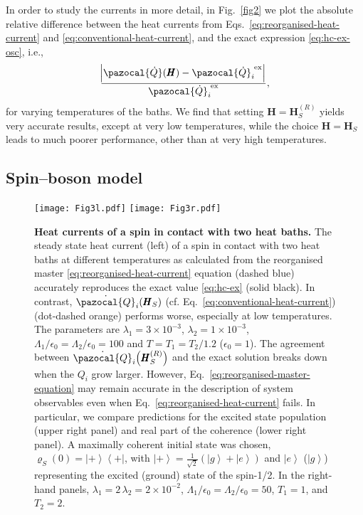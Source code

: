 \documentclass[aps,pra,superscriptaddress,twocolumn,nofootinbib]{revtex4-2}
\newcommand{\ket}[1]{\left\vert#1\right\rangle}
\newcommand{\bra}[1]{\left\langle#1\right\vert}
\begin{document}
In order to study the currents in more detail, in Fig.~\ref{fig2} we plot the absolute relative difference between the heat currents from Eqs.~\eqref{eq:reorganised-heat-current} and \eqref{eq:conventional-heat-current}, and the exact expression \eqref{eq:hc-ex-osc}, i.e.,
\begin{equation*}
	\frac{\abs{\pazocal{\dot Q}(\pmb{H})-\pazocal{\dot Q}^\text{ ex}_i}}{\pazocal{\dot Q}^\text{ ex}_i},
\end{equation*}
for varying temperatures of the baths. We find that setting $\pmb{H} = \pmb{H}_S^{(R)}$ yields very accurate results, except at very low temperatures, while the choice $\pmb{H} = \pmb{H}_S$ leads to much poorer performance, other than at very high temperatures.


\subsection{Spin--boson model}

\begin{figure*}[t]
\centering
\texttt{[image: Fig3l.pdf]}
\texttt{[image: Fig3r.pdf]}
\caption{\textbf{Heat currents of a spin in contact with two heat baths.} The steady state heat current (left) of a spin in contact with two heat baths at different temperatures as calculated from the reorganised master \eqref{eq:reorganised-heat-current} equation (dashed blue) accurately reproduces the exact value \eqref{eq:hc-ex} (solid black). In contrast, $\dot{\pazocal{Q}}_i(\pmb{H}_S)$ (cf. Eq.~\eqref{eq:conventional-heat-current}) (dot-dashed orange) performs worse, especially at low temperatures. The parameters are $\lambda_1= 3\times 10^{-3}$, $ \lambda_2=1 \times 10^{-3}$, $ \Lambda_1/\epsilon_0 = \Lambda_2/\epsilon_0 = 100$ and $T = T_1 = T_2 / 1.2$ ($\epsilon_0 = 1$). The agreement between $\dot{\pazocal{Q}}_i\big(\pmb{H}_S^{(R)}\big)$ and the exact solution breaks down when the $ Q_i $ grow larger. However, Eq.~\eqref{eq:reorganised-master-equation} may remain accurate in the description of system observables even when Eq.~\eqref{eq:reorganised-heat-current} fails. In particular, we compare predictions for the excited state population (upper right panel) and real part of the coherence (lower right panel). A maximally coherent initial state was chosen, $\pmb{\varrho}_S(0) = \ket{+}\bra{+}$, with $\ket{+} = \frac{1}{\sqrt{2}}(\ket{g} + \ket{e})$ and $\ket{e}$ ($\ket{g}$) representing the excited (ground) state of the spin-1/2. In the right-hand panels,  $\lambda_1 = 2\,\lambda_2 = 2 \times 10^{-2} $, $\Lambda_1/\epsilon_0 = \Lambda_2/\epsilon_0 = 50$, $T_1=1$, and $T_2=2$.}
\label{fig3}
\centering
\end{figure*}
\end{document}
